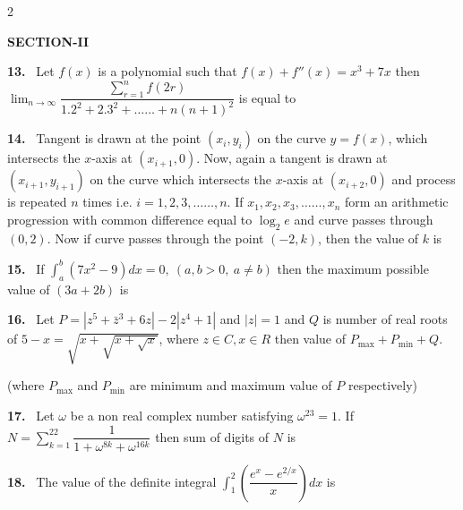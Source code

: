 \documentclass[10pt]{extarticle}
\newcommand{\sect}[1]{\par\smallskip\noindent\textbf{#1}\par}
\newcommand{\qn}[1]{\par\smallskip\noindent\textbf{#1.}~}
\newenvironment{qoptions}{\begin{itemize}[leftmargin=1.8em,itemsep=1pt,topsep=2pt,label={}]}{\end{itemize}}
\begin{document}
\begin{multicols}{2}
\begin{qoptions}
\end{qoptions}
\sect{SECTION-II}
\qn{13} Let $f(x)$ is a polynomial such that $f(x)+f''(x)=x^3+7x$ then $\displaystyle\lim_{n\to\infty}\dfrac{\displaystyle\sum_{r=1}^{n}f(2r)}{1.2^2+2.3^2+\ldots\ldots+n(n+1)^2}$ is equal to
\qn{14} Tangent is drawn at the point $(x_i,y_i)$ on the curve $y=f(x)$, which intersects the $x$-axis at $(x_{i+1},0)$. Now, again a tangent is drawn at $(x_{i+1},y_{i+1})$ on the curve which intersects the $x$-axis at $(x_{i+2},0)$ and process is repeated $n$ times i.e. $i=1,2,3,\ldots\ldots,n$. If $x_1,x_2,x_3,\ldots\ldots,x_n$ form an arithmetic progression with common difference equal to $\log_2e$ and curve passes through $(0,2)$. Now if curve passes through the point $(-2,k)$, then the value of $k$ is
\qn{15} If $\displaystyle\int_a^b\left(7x^2-9\right)dx=0,\ (a,b>0,\ a\ne b)$ then the maximum possible value of $(3a+2b)$ is
\qn{16} Let $P=\left|z^5+\bar z^3+6z\right|-2\left|z^4+1\right|$ and $|z|=1$ and $Q$ is number of real roots of $5-x=\sqrt{x+\sqrt{x+\sqrt x}}$, where $z\in C,x\in R$ then value of $P_{\max}+P_{\min}+Q$.

(where $P_{\max}$ and $P_{\min}$ are minimum and maximum value of $P$ respectively)
\qn{17} Let $\omega$ be a non real complex number satisfying $\omega^{23}=1$. If $N=\displaystyle\sum_{k=1}^{22}\dfrac{1}{1+\omega^{8k}+\omega^{16k}}$ then sum of digits of $N$ is
\qn{18} The value of the definite integral $\displaystyle\int_1^2\left(\dfrac{e^x-e^{2/x}}{x}\right)dx$ is
\end{multicols}
\end{document}
